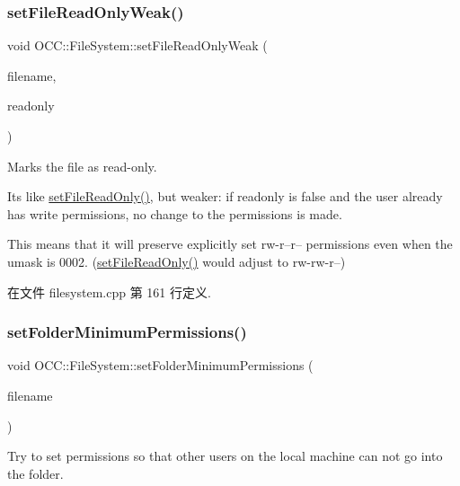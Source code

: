 \subsubsection{\texorpdfstring{set\+File\+Read\+Only\+Weak()}{setFileReadOnlyWeak()}}
{\footnotesize\ttfamily void O\+C\+C\+::\+File\+System\+::set\+File\+Read\+Only\+Weak (\begin{DoxyParamCaption}\item[{const Q\+String \&}]{filename,  }\item[{bool}]{readonly }\end{DoxyParamCaption})}



Marks the file as read-\/only. 

It\textquotesingle{}s like \hyperlink{namespace_o_c_c_1_1_file_system_a875f747aa9ad5b52ab5270aab7d52d46}{set\+File\+Read\+Only()}, but weaker\+: if readonly is false and the user already has write permissions, no change to the permissions is made.

This means that it will preserve explicitly set rw-\/r--r-- permissions even when the umask is 0002. (\hyperlink{namespace_o_c_c_1_1_file_system_a875f747aa9ad5b52ab5270aab7d52d46}{set\+File\+Read\+Only()} would adjust to rw-\/rw-\/r--) 

在文件 filesystem.\+cpp 第 161 行定义.

\mbox{\label{namespace_o_c_c_1_1_file_system_a5e58f0f7b6dab23f3dc1778b86bc2c6b}} 
\subsubsection{\texorpdfstring{set\+Folder\+Minimum\+Permissions()}{setFolderMinimumPermissions()}}
{\footnotesize\ttfamily void O\+C\+C\+::\+File\+System\+::set\+Folder\+Minimum\+Permissions (\begin{DoxyParamCaption}\item[{const Q\+String \&}]{filename }\end{DoxyParamCaption})}



Try to set permissions so that other users on the local machine can not go into the folder. 



